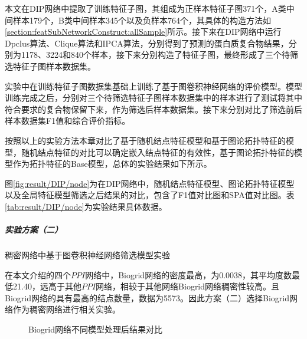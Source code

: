 本文在DIP网络中提取了训练特征子图，其组成为正样本特征子图371个，A类中间样本179个，B类中间样本345个以及负样本764个，其具体的构造方法如\ref{section:featSubNetworkConstruct:allSample}所示。接下来在DIP网络中运行Dpclus算法、Clique算法和IPCA算法，分别得到了预测的蛋白质复合物结果，分别为1178、3224和840个样本，接下来分别构造了特征子图，最终形成了三个待筛选特征子图样本数据集。

实验中在训练特征子图数据集基础上训练了基于图卷积神经网络的评价模型。模型训练完成之后，分别对三个待筛选特征子图样本数据集中的样本进行了测试将其中符合要求的复合物保留下来，作为筛选后样本数据集。接下来分别对比了筛选前后样本数据集F1值和综合评价指标。

按照以上的实验方法本章对比了基于随机结点特征模型和基于图论拓扑特征的模型，随机结点特征的对比可以确定嵌入结点特征的有效性，基于图论拓扑特征的模型作为拓扑特征的Base模型，总体的实验结果如下所示。



图\ref{fig:result/DIP/node}为在DIP网络中，随机结点特征模型、图论拓扑特征模型以及全局特征模型筛选之后结果的对比，包含了F1值对比图和SPA值对比图。表\ref{tab:result/DIP/node}为实验结果具体数据。

\subparagraph*{实验方案（二）} 稠密网络中基于图卷积神经网络筛选模型实验

在本文介绍的四个$PPI$网络中，Biogrid网络的密度最高，为0.0038，其平均度数最低21.40，远高于其他$PPI$网络，相较于其他网络Biogrid网络稠密性较高。且Biogrid网络的具有最高的结点数量，数据为5573。因此方案（二）选择Biogrid网络作为稠密网络进行相关实验。

\begin{figure}[htbp]
    \centering
    \vskip0.2cm
    \caption{Biogrid网络不同模型处理后结果对比}
    \label{fig:result/Biogrid/node}
\end{figure}

